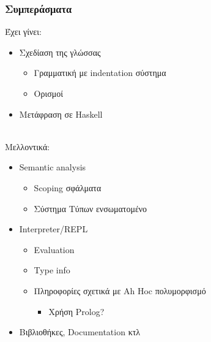 \documentclass{beamer}
\def\e{\foreignlanguage{english}}
\def\h{\e{Haskell}}
\begin{document}
\begin{frame}

\frametitle{Συμπεράσματα}

Έχει γίνει:
\begin{itemize}
\item Σχεδίαση της γλώσσας

\begin{itemize}
\item Γραμματική με \e{indentation} σύστημα

\item Ορισμοί

\end{itemize}

\item Μετάφραση σε \h
\\~\

\end{itemize}

Μελλοντικά:
\begin{itemize}
\item \e{Semantic analysis}

\begin{itemize}

\item \e{Scoping} σφάλματα

\item Σύστημα Τύπων ενσωματομένο

\end{itemize}

\item \e{Interpreter/REPL}

\begin{itemize}

\item \e{Evaluation}

\item \e{Type info}

\item Πληροφορίες σχετικά με \e{Ah Hoc} πολυμορφισμό

\begin{itemize}

\item Χρήση \e{Prolog}?

\end{itemize}

\end{itemize}

\item Βιβλιοθήκες, \e{Documentation} κτλ

\end{itemize}

\end{frame}
\end{document}
